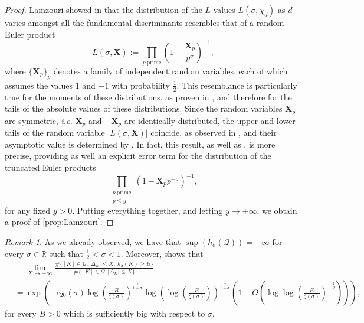 \documentclass[10pt,a4paper]{amsart}
\theoremstyle{plain}
\theoremstyle{definition}
\theoremstyle{remark}
\newtheorem{remark}[theorem]{Remark}
\begin{document}
    \begin{proof}
        Lamzouri showed in \cite[Theorem~1.6]{Lamzouri_2011} that the distribution of the $L$-values $L(\sigma,\chi_d)$ as $d$ varies amongst all the fundamental discriminants resembles that of a random Euler product 
        \[ L(\sigma,\mathbf{X}) := \prod_{p \ \text{prime}} \left( 1- \frac{\mathbf{X}_p}{p^\sigma} \right)^{-1},\] where $\{\mathbf{X}_p\}_p$ denotes a family of independent random variables, each of which assumes the values $1$ and $-1$ with probability $\frac{1}{2}$. This resemblance is particularly true for the moments of these distributions, as proven in \cite[Proposition~5.2]{Lamzouri_2011}, and therefore for the tails of the absolute values of these distributions. Since the random variables $\mathbf{X}_p$ are symmetric, \textit{i.e.} $\mathbf{X}_p$ and $-\mathbf{X}_p$ are identically distributed, the upper and lower tails of the random variable $\lvert L(\sigma,\mathbf{X}) \rvert$ coincide, as observed in \cite[Remark~4]{Lamzouri_2011}, and their asymptotic value is determined by \cite[Theorem~1.9]{Lamzouri_2011}. In fact, this result, as well as \cite[Theorem~1.6]{Lamzouri_2011}, is more precise, providing as well an explicit error term for the distribution of the truncated Euler products \[\prod_{\substack{p \ \text{prime} \\ p \leq y}} (1-\mathbf{X}_p p^{-\sigma})^{-1},\] for any fixed $y>0$. Putting everything together, and letting $y \to +\infty$, we obtain a proof of \cref{prop:Lamzouri}.
    \end{proof}

    \begin{remark}
        As we already observed, we have that $\sup(h_\sigma(\mathcal{Q})) = +\infty$ for every $\sigma \in \mathbb{R}$ such that $\frac{1}{2} < \sigma < 1$. Moreover, \cite[Theorem~1.6]{Lamzouri_2011} shows that
        \[
            \begin{aligned}
                &\phantom{=} \lim_{X \to +\infty} \frac{\# \{ [K] \in \mathcal{Q} \colon \lvert \Delta_K \rvert \leq X, \ h_\sigma(K) \geq B \}}{\# \{ [K] \in \mathcal{Q} \colon \lvert \Delta_K \rvert \leq X\}} \\ &= \exp\left( - c_{20}(\sigma) \log\left( \frac{B}{\zeta(\sigma)} \right)^{\frac{1}{1-\sigma}} \log\left(\log\left( \frac{B}{\zeta(\sigma)} \right)\right)^{\frac{\sigma}{1-\sigma}} \left( 1 + O\left( \log\log\left(\frac{B}{\zeta(\sigma)}\right)^{-\frac{1}{2}} \right) \right) \right),
            \end{aligned}
        \]
        for every $B > 0$ which is sufficiently big with respect to $\sigma$.
    \end{remark}
\end{document}
